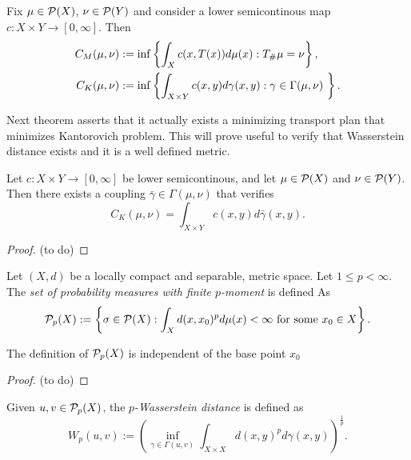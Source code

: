 \begin{definition}
    Fix $ \mu \in \mathcal P(X)$, $\nu \in \mathcal P(Y)$ and consider a lower semicontinous map $ c: X \times Y \to [0, \infty] $. Then
\begin{align*}
    C_M(\mu, \nu) &:= \inf \left\{\int_X c(x, T(x)) d\mu(x) : T_\#\mu = \nu \right\}, \\
    C_K(\mu, \nu) &:= \inf \left\{\int_{X \times Y} c(x, y) d\gamma(x,y) : \gamma \in \Gamma(\mu, \nu) \ \right\}.
\end{align*}
\end{definition}

Next theorem asserts that it actually exists a minimizing transport plan that minimizes Kantorovich problem. This will prove useful to verify that Wasserstein distance exists and it is a well defined metric.

\begin{theorem}
    Let $ c: X \times Y \to [0, \infty] $ be lower semicontinous, and let $ \mu \in \mathcal P(X) $ and $ \nu \in \mathcal P(Y) $. Then there exists a coupling $ \bar \gamma \in \Gamma(\mu, \nu) $ that verifies
    $$
    C_K(\mu, \nu) = \int_{X \times Y} c(x, y) d \bar \gamma(x,y).
    $$
\end{theorem}
\begin{proof}
    (to do)
\end{proof}

\begin{example}
    
\end{example}

\begin{definition}
    Let $ (X, d) $ be a locally compact and separable, metric space. Let $ 1 \leq p < \infty $. The {\it set of probability measures with finite $p$-moment} is defined As
    $$
        \mathcal P_p (X) := \left\{ \sigma \in \mathcal P (X) : \int_X d(x, x_0)^p d \mu (x) < \infty \text{ for some } x_0 \in X \right\}.
    $$
\end{definition}

\begin{proposition}
    The definition of $ \mathcal P_p (X) $ is independent of the base point $ x_0 $
\end{proposition}
\begin{proof}
    (to do)
\end{proof}

\begin{definition}
    Given $ u, v \in \mathcal P_p (X) $, the {\it $p$-Wasserstein distance} is defined as
    $$
        W_p(u, v) := \left( \inf_{\gamma \in \Gamma(u, v)} \int_{X \times X} d(x,y)^p d\gamma(x, y)\right)^{\frac{1}{p}}.
    $$
\end{definition}

